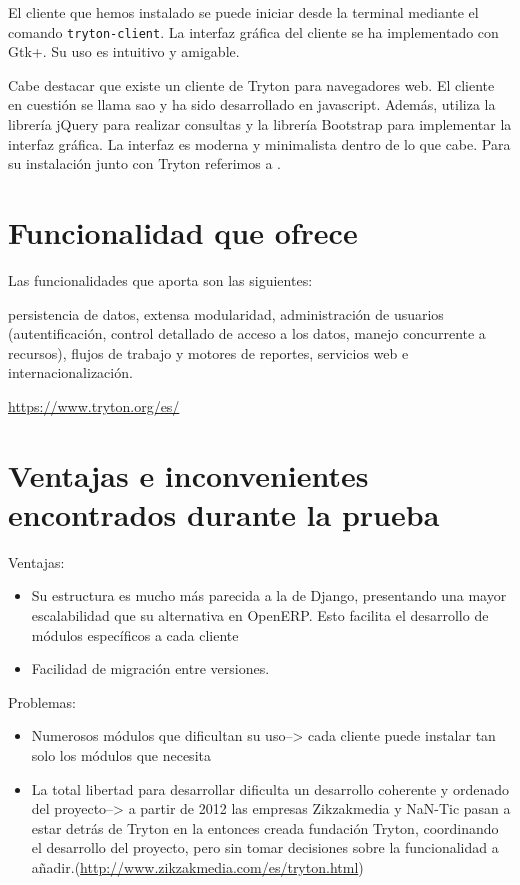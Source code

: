 \documentclass{article}
\begin{document}
El cliente que hemos instalado se puede iniciar desde la terminal mediante el comando \texttt{tryton-client}. La interfaz gráfica del cliente se ha implementado con Gtk+. Su uso es intuitivo y amigable.

Cabe destacar que existe un cliente de Tryton para navegadores web. El cliente en cuestión se llama sao y ha sido desarrollado en javascript. Además, utiliza la librería jQuery para realizar consultas y la librería Bootstrap para implementar la interfaz gráfica. La interfaz es moderna y minimalista dentro de lo que cabe. Para su instalación junto con Tryton referimos a \cite{sao}.



\section{Funcionalidad que ofrece}

Las funcionalidades que aporta son las siguientes:

persistencia de datos, extensa modularidad, administración de usuarios (autentificación, control detallado de acceso a los datos, manejo concurrente a recursos), flujos de trabajo y motores de reportes, servicios web e internacionalización.

\url{https://www.tryton.org/es/}


\section{Ventajas e inconvenientes encontrados durante la prueba}
Ventajas:
\begin{itemize}
    \item Su estructura es mucho más parecida a la de Django, presentando una mayor escalabilidad que su alternativa en OpenERP. Esto facilita el desarrollo de módulos específicos a cada cliente
    \item Facilidad de migración entre versiones.
\end{itemize}

Problemas:
\begin{itemize}
    \item Numerosos módulos que dificultan su uso--> cada cliente puede instalar tan solo los módulos que necesita
    \item La total libertad para desarrollar dificulta un desarrollo coherente y ordenado del proyecto--> a partir de 2012 las empresas Zikzakmedia y NaN-Tic pasan a estar detrás de Tryton en la entonces creada fundación Tryton, coordinando el desarrollo del proyecto, pero sin tomar decisiones sobre la funcionalidad a añadir.(\url{http://www.zikzakmedia.com/es/tryton.html})
\end{itemize}
\end{document}
